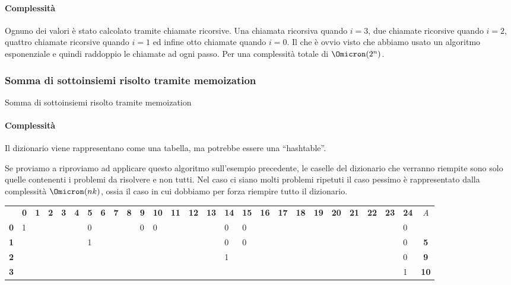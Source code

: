 \paragraph{Complessità}
Ognuno dei valori è stato calcolato tramite chiamate ricorsive.
Una chiamata ricorsiva quando \(i=3\), due chiamate ricorsive quando \(i=2\), quattro chiamate ricorsive quando \(i=1\) ed infine otto chiamate quando \(i=0\).
Il che è ovvio visto che abbiamo usato un algoritmo esponenziale e quindi raddoppio le chiamate ad ogni passo.
Per una complessità totale di \(\Omicron(2^n)\).

\subsubsection{Somma di sottoinsiemi risolto tramite memoization}

\begin{algorithm}[H]
	\caption{Somma di sottoinsiemi risolto tramite memoization}
	
\end{algorithm}

\paragraph{Complessità}
Il dizionario viene rappresentano come una tabella, ma potrebbe essere una \enquote{hashtable}.

Se proviamo a riproviamo ad applicare questo algoritmo sull'esempio precedente, le caselle del dizionario che verranno riempite sono solo quelle contenenti i problemi da risolvere e non tutti.
Nel caso ci siano molti problemi ripetuti il caso pessimo è rappresentato dalla complessità \(\Omicron(nk)\), ossia il caso in cui dobbiamo per forza riempire tutto il dizionario.

{
\setlength{\tabcolsep}{3pt}
\begin{tabularx}{\textwidth}{@{} l *{25}{ Y } c @{}}
	\toprule
		& \textbf{0} & \textbf{1} & \textbf{2} & \textbf{3} & \textbf{4} & \textbf{5} & \textbf{6} & \textbf{7} & \textbf{8} & \textbf{9} & \textbf{10} & \textbf{11} & \textbf{12} & \textbf{13} & \textbf{14} & \textbf{15} & \textbf{16} & \textbf{17} & \textbf{18} & \textbf{19} & \textbf{20} & \textbf{21} & \textbf{22} & \textbf{23} & \textbf{24} & \emph{A}\\
		\textbf{0} & 1 &&&&& 0 &&&& 0 & 0 &&&& 0 & 0 &&&&&&&&& 0 & \\
	\lightrule
		\textbf{1} &&&&&& 1 &&&&&&&&& 0 & 0 &&&&&&&&& 0 & \textbf{5}\\
	\lightrule
		\textbf{2} &&&&&&&&&&&&&&& 1 &&&&&&&&&& 0 & \textbf{9}\\
	\lightrule
		\textbf{3} &&&&&&&&&&&&&&&&&&&&&&&&& 1 & \textbf{10}\\
	\bottomrule
\end{tabularx}
}

